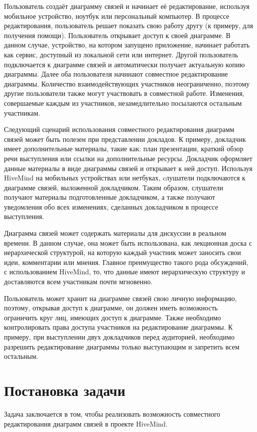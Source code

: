 Пользователь создаёт диаграмму связей и начинает её редактирование, используя
мобильное устройство, ноутбук или персональный компьютер. В процессе
редактирования, пользователь решает показать свою работу другу (к примеру, для
получения помощи). Пользователь открывает доступ к своей диаграмме. В данном
случае, устройство, на котором запущено приложение, начинает работать как
сервис, доступный из локальной сети или интернет. Другой пользователь
подключается к диаграмме связей и автоматически получает актуальную копию
диаграммы. Далее оба пользователя начинают совместное редактирование диаграммы.
Количество взаимодействующих участников неограниченно, поэтому другие
пользователи также могут участвовать в совместной работе. Изменения, совершаемые
каждым из участников, незамедлительно посылаются остальным участникам.

Следующий сценарий использования совместного редактирования диаграмм связей
может быть полезен при представлении докладов. К примеру, докладчик имеет
дополнительные материалы, такие как: план презентации, краткий обзор речи
выступления или ссылки на дополнительные ресурсы. Докладчик оформляет данные
материалы в виде диаграммы связей и открывает к ней доступ. Используя HiveMind
на мобильных устройствах или нетбуках, cлушатели подключаются к диаграмме
связей, выложенной докладчиком. Таким образом, слушатели получают материалы
подготовленные докладчиком, а также получают уведомления обо всех изменениях,
сделанных докладчиком в процессе выступления.

Диаграмма связей может содержать материалы для дискуссии в реальном времени. В
данном случае, она может быть использована, как лекционная доска с иерархической
структурой, на которую каждый участник может заносить свои идеи, комментарии или
мнения. Главное преимущество такого рода обсуждений, с использованием HiveMind,
то, что данные имеют иерархическую структуру и доставляются всем участникам
почти мгновенно.

Пользователь может хранит на диаграмме связей свою личную информацию, поэтому,
открывая доступ к диаграмме, он должен иметь возможность ограничить круг
лиц, имеющих доступ к диаграмме. Также необходимо контролировать права доступа
участников на редактирование диаграммы. К примеру, при выступлении двух
докладчиков перед аудиторией, необходимо разрешить редактирование диаграммы
только выступающим и запретить всем остальным.


\section{Постановка задачи}
\label{sec:problem_statement}
Задача заключается в том, чтобы реализовать возможность совместного
редактирования диаграмм связей в проекте HiveMind.

